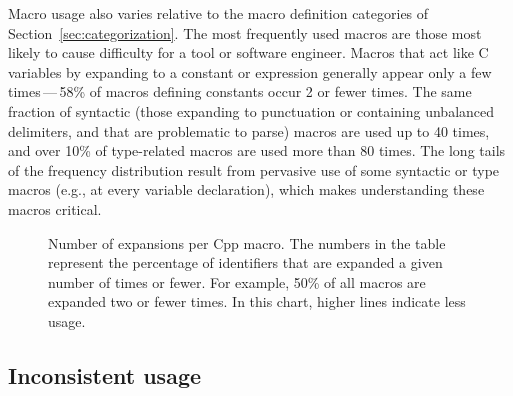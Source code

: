 \documentclass[10pt]{article}
\newcommand{\pkg}[1]{\textsf{#1}}
\newcommand{\captionsmall}[1]{\caption[]{\small #1}}
\begin{document}
Macro usage also varies relative to the macro definition categories of
Section~\ref{sec:categorization}.
The most frequently used macros are those most likely to cause difficulty
for a tool or software engineer.  Macros that act like C variables by
expanding to a constant or expression generally appear only a few
times\,---\,58\% of macros defining constants occur 2 or fewer times.
The same fraction of syntactic (those expanding to punctuation or
containing unbalanced delimiters, and that are problematic to parse)
macros are used up to 40 times, and over 10\% of type-related macros are
used more than 80 times.  The long tails of the frequency distribution
result from pervasive use of some syntactic or type macros (e.g., at every
variable declaration), which makes understanding these macros critical.


\begin{figure}
\centerline{}
\captionsmall{Number of expansions per Cpp macro.  The numbers in the
  table represent the percentage of identifiers that are expanded a given
  number of times or fewer.  For example, 50\% of all macros are expanded
  two or fewer times.  In this chart, higher lines indicate less usage.}
\label{fig:freq-use-cat}
\end{figure}



\subsection{Inconsistent usage}
\label{sec:inconsistent-usage}
\end{document}
